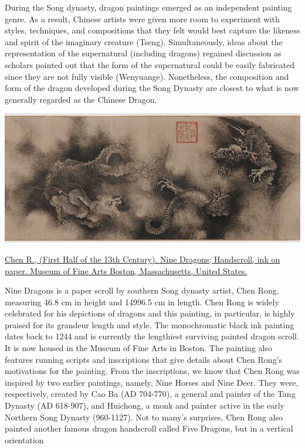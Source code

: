 \documentclass[
]{book}
\begin{document}
During the Song dynasty, dragon paintings emerged as an independent painting genre. As a result, Chinese artists were given more room to experiment with styles, techniques, and compositions that they felt would best capture the likeness and spirit of the imaginary creature (Tseng). Simultaneously, ideas about the representation of the supernatural (including dragons) regained discussion as scholars pointed out that the form of the supernatural could be easily fabricated since they are not fully visible (Wenyuange). Nonetheless, the composition and form of the dragon developed during the Song Dynasty are closest to what is now generally regarded as the Chinese Dragon.

\includegraphics[width=1.2\textwidth,height=\textheight]{images/Nine_Dragons.jpg}

\href{https://collections.mfa.org/objects/28526}{Chen R., (First Half of the 13th Century). Nine Dragons; Handscroll, ink on paper. Museum of Fine Arts Boston, Massachusetts, United States.}

Nine Dragons is a paper scroll by southern Song dynasty artist, Chen Rong, measuring 46.8 cm in height and 14996.5 cm in length. Chen Rong is widely celebrated for his depictions of dragons and this painting, in particular, is highly praised for its grandeur length and style. The monochromatic black ink painting dates back to 1244 and is currently the lengthiest surviving painted dragon scroll. It is now housed in the Museum of Fine Arts in Boston.
The painting also features running scripts and inscriptions that give details about Chen Rong's motivations for the painting. From the inscriptions, we know that Chen Rong was inspired by two earlier paintings, namely, Nine Horses and Nine Deer. They were, respectively, created by Cao Ba (AD 704-770), a general and painter of the Tang Dynasty (AD 618-907), and Huichong, a monk and painter active in the early Northern Song Dynasty (960-1127). Not to many's surprises, Chen Rong also painted another famous dragon handscroll called Five Dragons, but in a vertical orientation
\end{document}

